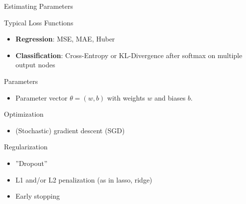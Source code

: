 \documentclass[ignorenonframetext,xcolor=x11names]{beamer}
\begin{document}
\begin{frame}[label=full]{Estimating Parameters}
\footnotesize
\begin{block}{Typical Loss Functions}
\begin{itemize}  
  \item \textbf{Regression}: MSE, MAE, Huber
  \item \textbf{Classification}: Cross-Entropy or KL-Divergence after softmax on multiple output nodes 
\end{itemize}
\end{block}
\begin{block}{Parameters}
\begin{itemize}
  \item Parameter vector $\theta = (w, b)$ with weights $w$ and biases $b$. 
\end{itemize}
\end{block}
\begin{block}{Optimization}
\begin{itemize}
  \item (Stochastic) gradient descent (SGD)
\end{itemize}
\end{block}
\begin{block}{Regularization}
\begin{itemize}
  \item ''Dropout''
  \item L1 and/or L2 penalization (as in lasso, ridge)
  \item Early stopping
\end{itemize}
\end{block}
\end{frame}
\end{document}
